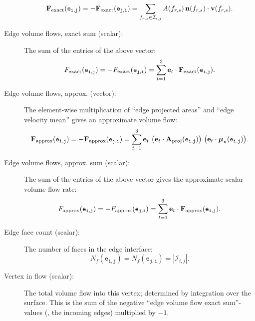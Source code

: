 \begin{description}
%
\begin{equation}
	\vec{F}_\text{exact}(\mathtt{e_{i,j}}) = 
	-\vec{F}_\text{exact}(\mathtt{e_{j,i}}) = 
		\sum\limits_{f_{r,s}\in\mathcal{I}_{i,j}}{
			\normprod{
				A(f_{r,s})
			}{
				\scalprod{ \vec{n}(f_{r,s}) }{ \vec{v}(f_{r,s}) }
			}
		}.
\end{equation}
%
%
  \item[Edge volume flows, exact sum (scalar):] The sum of the entries of the above vector:
%
\begin{equation}
	F_\text{exact}(\mathtt{e_{i,j}}) = 
	-F_\text{exact}(\mathtt{e_{j,i}}) = 
		\sum\limits_{t=1}^3{
			\scalprod{
				\vec{e}_t
			}{
				\vec{F}_\text{exact}(\mathtt{e_{i,j}})
			}
	 	}.
\end{equation}
%
%
  \item[Edge volume flows, approx. (vector):] The element\--\-wise multiplication of ``edge projected areas'' and ``edge velocity mean'' gives an approximate volume flow:
%
\begin{equation}
	\vec{F}_\text{approx}(\mathtt{e_{i,j}}) = 
	-\vec{F}_\text{approx}(\mathtt{e_{j,i}}) = 
		\sum\limits_{t=1}^3{
			\normprod{
				\vec{e}_t
			}{
				\normprod{
					\left( 
						\scalprod{
							\vec{e}_t
						}{
					 		\vec{A}_\text{proj}(\mathtt{e_{i,j}})
						}
					\right)
				}{
					\left(
						\scalprod{
							\vec{e}_t
						}{
							\boldsymbol\mu_\vec{v}(\mathtt{e_{i,j}})
						} 
					\right)
				}
			}
		}.
\end{equation}
%
%
  \item[Edge volume flows, approx. sum (scalar):] The sum of the entries of the above vector gives the approximate scalar volume flow rate:
%
\begin{equation}
	F_\text{approx}(\mathtt{e_{i,j}}) = 
	-F_\text{approx}(\mathtt{e_{j,i}}) = 
		\sum\limits_{t=1}^3{
			\scalprod{
				\vec{e}_t
			}{
				\vec{F}_\text{approx}(\mathtt{e_{i,j}})
			}
	 	}.
\end{equation}
%
%
	\item[Edge face count (scalar):] The number of faces in the edge interface:
%
\begin{equation}
	N_f(\mathtt{e_{i,j}}) = 
	N_f(\mathtt{e_{j,i}}) =
	\left| \mathcal{I}_{i,j} \right|.
\end{equation}
%
%
  \item[Vertex in flow (scalar):] The total volume flow into this vertex; determined by integration over the surface. This is the sum of the negative ``edge volume flow exact sum''-values (\ie, the incoming edges) multiplied by $-1$.

\end{description}
